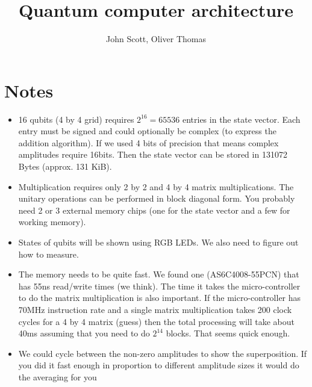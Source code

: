 \documentclass{article}
\begin{document}
\title{Quantum computer architecture}
\author{John Scott, Oliver Thomas}
\maketitle


\section{Notes}

\begin{itemize}
\item 16 qubits (4 by 4 grid) requires $2^16=65536$ entries in the state vector. Each entry must be signed and could optionally be complex (to express the addition algorithm). If we used 4 bits of precision that means complex amplitudes require 16bits. Then the state vector can be stored in 131072 Bytes (approx. 131 KiB).
\item Multiplication requires only 2 by 2 and 4 by 4 matrix multiplications. The unitary operations can be performed in block diagonal form. You probably need 2 or 3 external memory chips (one for the state vector and a few for working memory).
\item States of qubits will be shown using RGB LEDs. We also need to figure out how to measure.
\item The memory needs to be quite fast. We found one (AS6C4008-55PCN) that has 55ns read/write times (we think). The time it takes the micro-controller to do the matrix multiplication is also important. If the micro-controller has 70MHz instruction rate and a single matrix multiplication takes 200 clock cycles for a 4 by 4 matrix (guess) then the total processing will take about 40ms assuming that you need to do $2^14$ blocks. That seems quick enough.
  \item We could cycle between the non-zero amplitudes to show the superposition. If you did it fast enough in proportion to different amplitude sizes it would do the averaging for you
\end{itemize}
\end{document}
